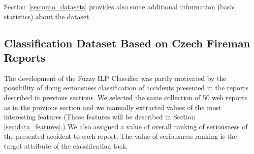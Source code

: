 Section~\ref{sec:onto_datasets} provides also some additional information (basic statistics) about the dataset.



\subsection{Classification Dataset Based on Czech Fireman Reports} \label{sec:data_classify_fireman}

The development of the Fuzzy ILP Classifier was partly motivated by the possibility of doing seriousness classification of accidents presented in the reports described in previous sections. We selected the same collection of 50 web reports as in the previous section and we manually extracted values of the most interesting features (These features will be described in Section \ref{sec:data_features}.) We also assigned a value of overall ranking of seriousness of the presented accident to each report.  The value of seriousness ranking is the target attribute of the classification task. 








